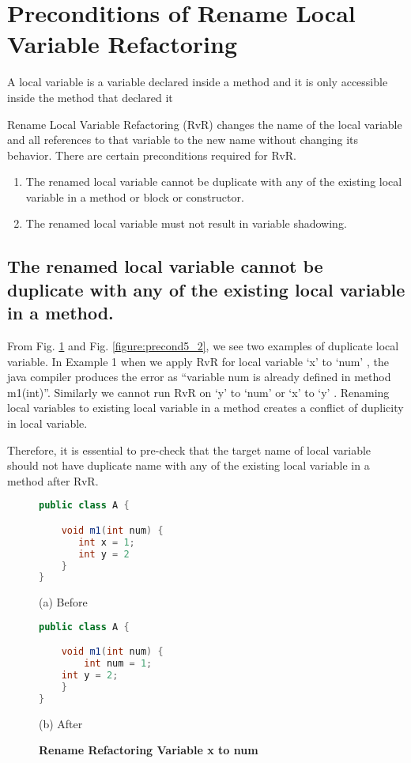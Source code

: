 \section{\textbf{Preconditions of Rename Local Variable Refactoring}}
A local variable is a variable declared inside a method and it is only accessible inside the method that declared it

Rename Local Variable Refactoring (RvR) changes the name of the local variable and all references to that variable to the new name without changing its behavior. There are certain preconditions required for RvR.
\begin{enumerate}
\item The renamed local variable cannot be duplicate with any of the existing local variable in a method or block or constructor.
\item The renamed local variable must not result in variable shadowing.
\end{enumerate}

\subsection{The renamed local variable cannot be duplicate with any of the existing local variable in a method.}
 
From Fig. \ref{figure:precond5_1} and Fig. \ref{figure:precond5_2}, we see two examples of duplicate local variable. In Example 1 when we apply RvR for local variable `x' to `num' , the java compiler produces the error as ``variable num is already defined in method m1(int)''. Similarly we cannot run RvR on  `y'  to `num' or `x'  to `y' . Renaming local variables to existing local variable in a method creates a conflict of duplicity in local variable.

Therefore, it is essential to pre-check that the target name of local variable should not have duplicate name with any of the existing local variable in a method after RvR.

\begin{figure}[th]
\centering
\begin{minipage}[t]{0.4\linewidth}
\begin{lstlisting}[language=java, basicstyle=\scriptsize\ttfamily,frame=single]
public class A {

    void m1(int num) {
       int x = 1; 
       int y = 2
    }
}
\end{lstlisting}
\centering(a) Before
\end{minipage}
\hfill
\begin{minipage}[t]{0.4\linewidth}
\begin{lstlisting}[language=java, basicstyle=\scriptsize\ttfamily,frame=single]
public class A {

    void m1(int num) {
        int num = 1; 
	int y = 2;
    }
}
\end{lstlisting}
\centering(b) After 
\end{minipage}
\caption{\textbf{Rename Refactoring Variable x to num}}
\label{figure:precond5_1}
\end{figure}

